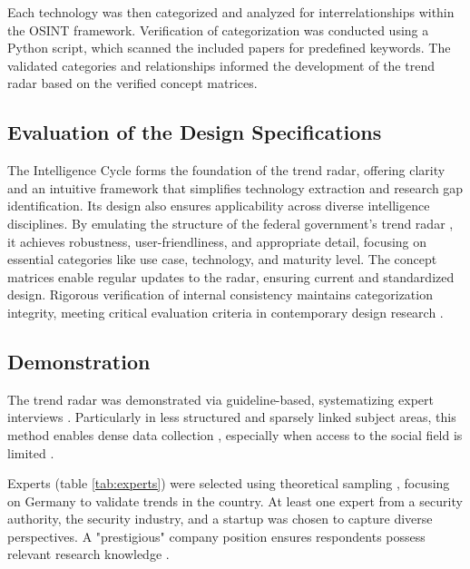 \documentclass[10pt]{article}
\begin{document}
Each technology was then categorized and analyzed for interrelationships within the OSINT framework. Verification of categorization was conducted using a Python script, which scanned the included papers for predefined keywords. The validated categories and relationships informed the development of the trend radar based on the verified concept matrices.


\subsection{Evaluation of the Design Specifications}
The Intelligence Cycle forms the foundation of the trend radar, offering clarity and an intuitive framework that simplifies technology extraction and research gap identification. Its design also ensures applicability across diverse intelligence disciplines. By emulating the structure of the federal government's trend radar \cite{Stich.2022}, it achieves robustness, user-friendliness, and appropriate detail, focusing on essential categories like use case, technology, and maturity level. The concept matrices enable regular updates to the radar, ensuring current and standardized design. Rigorous verification of internal consistency maintains categorization integrity, meeting critical evaluation criteria in contemporary design research \cite{vomBrocke.2020b}.


\subsection{Demonstration}
The trend radar was demonstrated via guideline-based, systematizing expert interviews \cite{Bogner.2014, Glaser.2009, Meuser.1991}. Particularly in less structured and sparsely linked subject areas, this method enables dense data collection \cite{Bogner.2014, Meuser.1991}, especially when access to the social field is limited \cite{Bogner.2002c, Glaser.2009}.

Experts (table \ref{tab:experts}) were selected using theoretical sampling \cite{Glaser.1967}, focusing on Germany to validate trends in the country. At least one expert from a security authority, the security industry, and a startup was chosen to capture diverse perspectives. A "prestigious" company position ensures respondents possess relevant research knowledge \cite{Bogner.2002b}.
\end{document}
